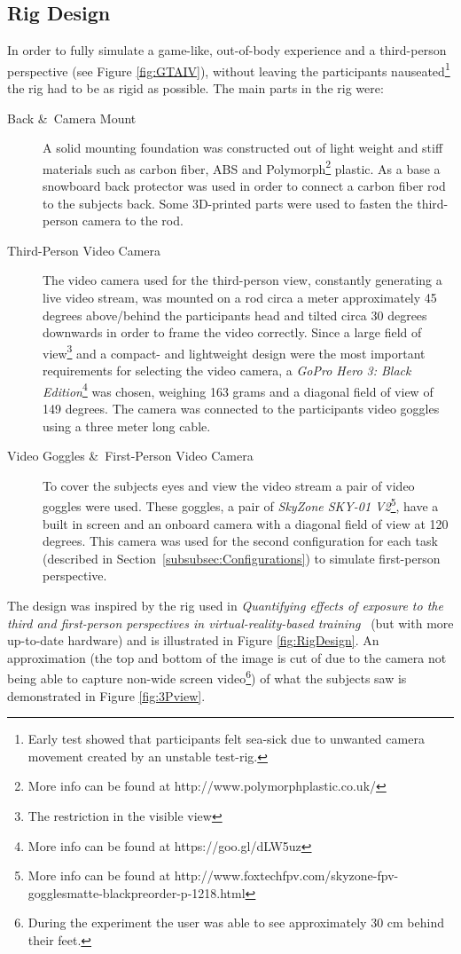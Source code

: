 \documentclass[runningheads,a4paper,oribibl]{llncs}
\begin{document}
\subsection{Rig Design}
In order to fully simulate a game-like, out-of-body experience and a third-person perspective (see Figure \ref{fig:GTAIV}), without leaving the participants nauseated\footnote{Early test showed that participants felt sea-sick due to unwanted camera movement created by an unstable test-rig.} the rig had to be as rigid as possible. The main parts in the rig were:
\begin{description}
   \item[Back \&\ Camera Mount] A solid mounting foundation was constructed out of light weight and stiff materials such as carbon fiber, ABS and Polymorph\footnote{More info can be found at http://www.polymorphplastic.co.uk/} plastic. As a base a snowboard back protector was used in order to connect a carbon fiber rod to the subjects back. Some 3D-printed parts were used to fasten the third-person camera to the rod.

   \item[Third-Person Video Camera] The video camera used for the third-person view, constantly generating a live video stream, was mounted on a rod circa a meter approximately 45 degrees above/behind the participants head and tilted circa 30 degrees downwards in order to frame the video correctly. Since a large field of view\footnote{The restriction in the visible view} and a compact- and lightweight design were the most important requirements for selecting the video camera, a \emph{GoPro Hero 3: Black Edition}\footnote{More info can be found at https://goo.gl/dLW5uz} was chosen, weighing 163 grams and a diagonal field of view of 149 degrees. The camera was connected to the participants video goggles using a three meter long cable.
   \item[Video Goggles \&\ First-Person Video Camera] To cover the subjects eyes and view the video stream a pair of video goggles were used. These goggles, a pair of \emph{SkyZone SKY-01 V2}\footnote{More info can be found at http://www.foxtechfpv.com/skyzone-fpv-gogglesmatte-blackpreorder-p-1218.html}, have a built in screen and an onboard camera with a diagonal field of view at 120 degrees. This camera was used for the second configuration for each task (described in Section~\ref{subsubsec:Configurations}) to simulate first-person perspective.
\end{description}
The design was inspired by the rig used in \emph{Quantifying effects of exposure to the third and first-person perspectives in virtual-reality-based training}~\cite{salamin2010quantifying} (but with more up-to-date hardware) and is illustrated in Figure \ref{fig:RigDesign}. An approximation (the top and bottom of the image is cut of due to the camera not being able to capture non-wide screen video\footnote{During the experiment the user was able to see approximately 30 cm behind their feet.}) of what the subjects saw is demonstrated in Figure \ref{fig:3Pview}.
\end{document}
